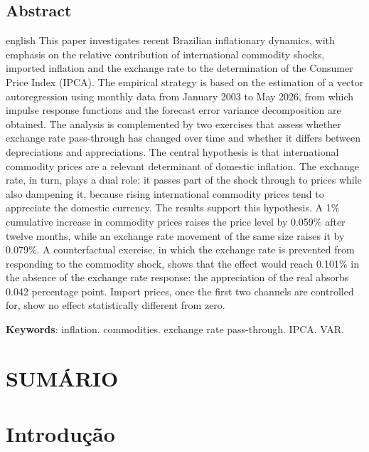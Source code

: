 \documentclass[12pt,openright,oneside,a4paper,portuguese,brazil]{abntex2}
\makeatletter
\renewcommand{\tableofcontents}{%
  \chapter*{SUMÁRIO}
  \@starttoc{toc}
}
\makeatother
\begin{document}
\section*{Abstract}
\begin{otherlanguage*}{english}
\justifying
\hspace{1em}
This paper investigates recent Brazilian inflationary dynamics, with
emphasis on the relative contribution of international commodity shocks,
imported inflation and the exchange rate to the determination of the
Consumer Price Index (IPCA). The empirical strategy is based on the
estimation of a vector autoregression using monthly data from January 2003 to
May 2026, from which impulse response functions and the forecast error variance
decomposition are obtained. The analysis is complemented by two exercises that
assess whether exchange rate pass-through has changed over time and whether it
differs between depreciations and appreciations. The central hypothesis is that international commodity prices are a relevant
determinant of domestic inflation. The exchange rate, in turn, plays a dual
role: it passes part of the shock through to prices while also dampening it,
because rising international commodity prices tend to appreciate the domestic
currency. The results support this hypothesis. A 1\% cumulative increase in
commodity prices raises the price level by 0.059\% after twelve months, while
an exchange rate movement of the same size raises it by 0.079\%. A
counterfactual exercise, in which the exchange rate is prevented from
responding to the commodity shock, shows that the effect would reach 0.101\%
in the absence of the exchange rate response: the appreciation of the real
absorbs 0.042 percentage point. Import prices, once the first two channels are
controlled for, show no effect statistically different from zero.

\vspace{\onelineskip}
\noindent\textbf{Keywords}: inflation. commodities. exchange rate
pass-through. IPCA. VAR.
\end{otherlanguage*}



\sffamily
\tableofcontents

\rmfamily


\textual

\chapter{Introdução}
\label{cap:introducao}
\justifying
\end{document}
